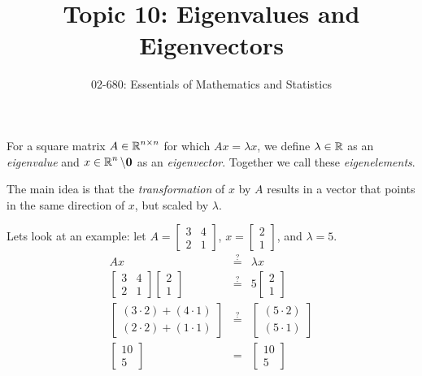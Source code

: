 


\title{Topic 10: Eigenvalues and Eigenvectors}
\author{02-680: Essentials of Mathematics and Statistics}


\maketitle

For a square matrix $A\in\operatorname{\mathbb{R}}^{n\times n}$ for which $Ax=\lambda x$, 
we define $\lambda\in\operatorname{\mathbb{R}}$ as an \emph{eigenvalue} and $x\in\operatorname{\mathbb{R}}^{n}\setminus\mathbf{0}$ as an \emph{eigenvector}. 
Together we call these \emph{eigenelements}. 

The main idea is that the \emph{transformation} of $x$ by $A$ results in a vector that points in the same direction of $x$, but scaled by $\lambda$. 

Lets look at an example: let $A=\begin{bmatrix}3 & 4 \\ 2 & 1\end{bmatrix}$, $x=\begin{bmatrix}2\\1\end{bmatrix}$, and $\lambda=5$.
\[\begin{array}{rcl}
Ax&  \stackrel{?}{=}  &\lambda x\\
\begin{bmatrix}3 & 4 \\ 2 & 1\end{bmatrix}\begin{bmatrix}2\\1\end{bmatrix} &  \stackrel{?}{=}  & 5\begin{bmatrix}2\\1\end{bmatrix}\\
\begin{bmatrix}(3\cdot2)+(4\cdot1)\\(2\cdot2)+(1\cdot1)\end{bmatrix} &  \stackrel{?}{=}  & \begin{bmatrix}(5\cdot2)\\(5\cdot1)\end{bmatrix}\\
\begin{bmatrix}10\\5\end{bmatrix} & = & \begin{bmatrix}10\\5\end{bmatrix}\\
\end{array}\]

